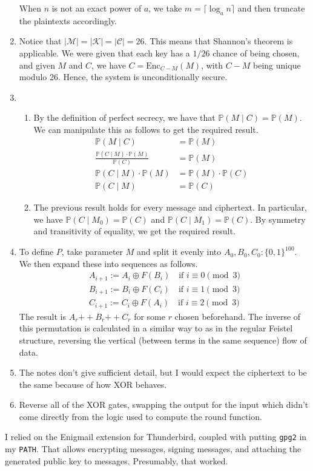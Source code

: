 \documentclass{article}
\begin{document}
\begin{enumerate}
    When $n$ is not an exact power of $a$, we take $m = \lceil \log_a n \rceil$ and then truncate the plaintexts accordingly.
  \item
    Notice that $\lvert \mathcal M \rvert = \lvert \mathcal K \rvert = \lvert \mathcal C \rvert = 26$. This means that Shannon's theorem is applicable. We were given that each key has a $1/26$ chance of being chosen, and given $M$ and $C$, we have $C = \mathrm{Enc}_{C-M}(M)$, with $C-M$ being unique modulo 26. Hence, the system is unconditionally secure.
  \item
    \begin{enumerate}
      \item By the definition of perfect secrecy, we have that $\mathbb P(M \mid C) = \mathbb P(M)$. We can manipulate this as follows to get the required result.
        \begin{align*}
          \mathbb P(M \mid C) & = \mathbb P(M)
          \\
          \frac{\mathbb P(C \mid M) \cdot \mathbb P(M)}{\mathbb P(C)}
            & = \mathbb P(M)
          \\
          \mathbb P(C \mid M) \cdot \mathbb P(M)
            & = \mathbb P(M) \cdot \mathbb P(C)
          \\
          \mathbb P(C \mid M) & = \mathbb P(C)
        \end{align*}
      \item The previous result holds for every message and ciphertext. In particular, we have $\mathbb P(C \mid M_0) = \mathbb P(C)$ and $\mathbb P(C \mid M_1) = \mathbb P(C)$. By symmetry and transitivity of equality, we get the required result.
    \end{enumerate}
    \setcounter{enumi}{6}
  \item
    To define $P$, take parameter $M$ and split it evenly into $A_0, B_0, C_0 : \{0,1\}^{100}$. We then expand these into sequences as follows.
    \begin{align*}
      A_{i+1} := A_i \oplus F(B_i) \quad \textrm{if }i \equiv 0 \pmod 3
      \\
      B_{i+1} := B_i \oplus F(C_i) \quad \textrm{if }i \equiv 1 \pmod 3
      \\
      C_{i+1} := C_i \oplus F(A_i) \quad \textrm{if }i \equiv 2 \pmod 3
    \end{align*}
    The result is $A_r \mathbin{++} B_r \mathbin{++} C_r$ for some $r$ chosen beforehand. The inverse of this permutation is calculated in a similar way to as in the regular Feistel structure, reversing the vertical (between terms in the same sequence) flow of data.
  \item The notes don't give sufficient detail, but I would expect the ciphertext to be the same because of how XOR behaves.
  \item Reverse all of the XOR gates, swapping the output for the input which didn't come directly from the logic used to compute the round function.
\end{enumerate}

I relied on the Enigmail extension for Thunderbird, coupled with putting \texttt{gpg2} in my \texttt{PATH}. That allows encrypting messages, signing messages, and attaching the generated public key to messages. Presumably, that worked.
\end{document}
